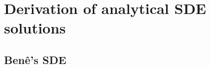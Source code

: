 \chapter{Derivation of analytical SDE solutions}



\section{Ben\^e's SDE}\label{app:bene_calculations}


